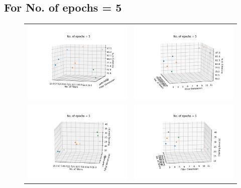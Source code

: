 \documentclass{article} %
\begin{document}
\subsection{For No. of epochs = 5}
\begin{figure}[H]
\centering
\begin{tabular}{cc}
\includegraphics[width=0.5\linewidth]{images/e5a1.png}
&
\includegraphics[width=0.5\linewidth]{images/e5a2.png}
\\
\includegraphics[width=0.5\linewidth]{images/e5t1.png}
&
\includegraphics[width=0.5\linewidth]{images/e5t2.png}
\end{tabular}
\end{figure}
\end{document}
